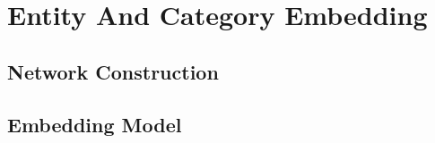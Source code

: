 \section{Entity And Category Embedding} \label{search_entity:entity_cat_embedding}
\subsection{Network Construction} 

\subsection{Embedding Model}
